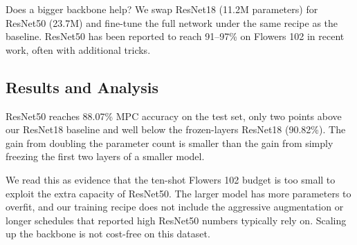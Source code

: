 Does a bigger backbone help? We swap ResNet18 (11.2M parameters) for ResNet50 (23.7M) and fine-tune the full network under the same recipe as the baseline. ResNet50 has been reported to reach 91--97\% on Flowers 102 in recent work, often with additional tricks.

\subsection{Results and Analysis}
ResNet50 reaches 88.07\% MPC accuracy on the test set, only two points above our ResNet18 baseline and well below the frozen-layers ResNet18 (90.82\%). The gain from doubling the parameter count is smaller than the gain from simply freezing the first two layers of a smaller model.

We read this as evidence that the ten-shot Flowers 102 budget is too small to exploit the extra capacity of ResNet50. The larger model has more parameters to overfit, and our training recipe does not include the aggressive augmentation or longer schedules that reported high ResNet50 numbers typically rely on. Scaling up the backbone is not cost-free on this dataset.
